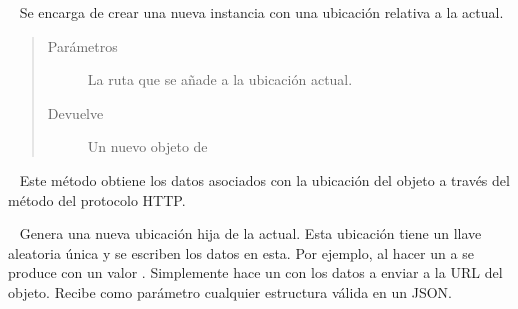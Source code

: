 \begin{fulllineitems}
\label{\detokenize{nao_firebase:firebase.FirebaseDatabase.child}}~
Se encarga de crear una nueva instancia con una ubicación relativa a la actual.
\begin{quote}\begin{description}
\item[{Parámetros}] \leavevmode
{} \textendash{} La ruta que se añade a la ubicación actual.

\item[{Devuelve}] \leavevmode
Un nuevo objeto de 

\end{description}\end{quote}

\end{fulllineitems}


\begin{fulllineitems}
\label{\detokenize{nao_firebase:firebase.FirebaseDatabase.get}}~
Este método obtiene los datos asociados con la ubicación del objeto a través
del método  del protocolo HTTP.

\end{fulllineitems}


\begin{fulllineitems}
\label{\detokenize{nao_firebase:firebase.FirebaseDatabase.push}}~
Genera una nueva ubicación hija de la actual. Esta ubicación tiene un
llave aleatoria única y se escriben los datos en esta.
Por ejemplo, al hacer un  a 
se produce  con un valor .
Simplemente hace un  con los datos a enviar  a la URL del objeto. Recibe como parámetro cualquier estructura válida en un JSON.

\end{fulllineitems}

